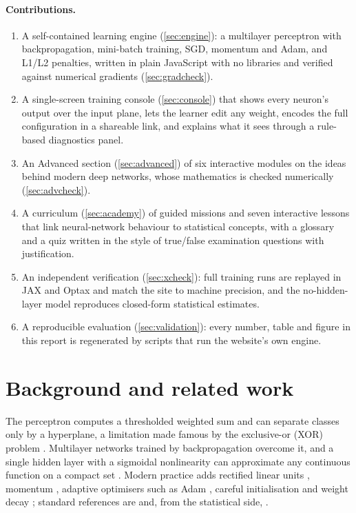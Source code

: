 \documentclass[11pt,a4paper]{article}
\begin{document}
\paragraph{Contributions.}
\begin{enumerate}[label=(\roman*)]
  \item A self-contained learning engine (\cref{sec:engine}): a multilayer perceptron with backpropagation, mini-batch training, SGD, momentum and Adam, and L1/L2 penalties, written in plain JavaScript with no libraries and verified against numerical gradients (\cref{sec:gradcheck}).
  \item A single-screen training console (\cref{sec:console}) that shows every neuron's output over the input plane, lets the learner edit any weight, encodes the full configuration in a shareable link, and explains what it sees through a rule-based diagnostics panel.
  \item An Advanced section (\cref{sec:advanced}) of six interactive modules on the ideas behind modern deep networks, whose mathematics is checked numerically (\cref{sec:advcheck}).
  \item A curriculum (\cref{sec:academy}) of \nMissions{} guided missions and seven interactive lessons that link neural-network behaviour to statistical concepts, with a glossary and a quiz written in the style of true/false examination questions with justification.
  \item An independent verification (\cref{sec:xcheck}): full training runs are replayed in JAX and Optax and match the site to machine precision, and the no-hidden-layer model reproduces closed-form statistical estimates.
  \item A reproducible evaluation (\cref{sec:validation}): every number, table and figure in this report is regenerated by scripts that run the website's own engine.
\end{enumerate}

\section{Background and related work}\label{sec:background}

The perceptron \citep{rosenblatt1958perceptron} computes a thresholded weighted sum and can separate classes only by a hyperplane, a limitation made famous by the exclusive-or (XOR) problem \citep{minsky1969perceptrons}. Multilayer networks trained by backpropagation \citep{rumelhart1986backprop} overcome it, and a single hidden layer with a sigmoidal nonlinearity can approximate any continuous function on a compact set \citep{cybenko1989approximation,hornik1991approximation}. Modern practice adds rectified linear units \citep{nair2010relu,maas2013leaky}, momentum \citep{polyak1964momentum}, adaptive optimisers such as Adam \citep{kingma2015adam}, careful initialisation \citep{lecun1998efficient} and weight decay \citep{krogh1992weightdecay}; standard references are \citet{goodfellow2016deep} and, from the statistical side, \citet{hastie2009esl}.
\end{document}

